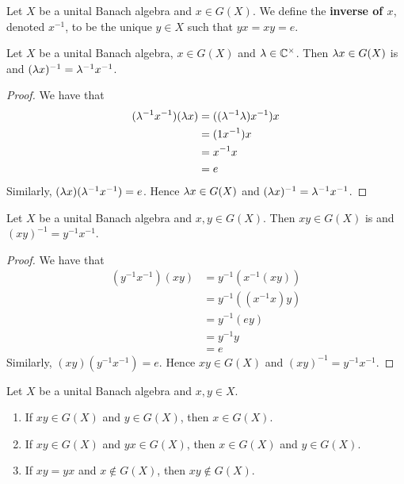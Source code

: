 \documentclass{book}
\begin{document}
\begin{defn} \ld{}
	Let $X$ be a unital Banach algebra and $x \in G(X)$. We define the \textbf{inverse of $x$}, denoted $x^{-1}$, to be the unique $y \in X$ such that $yx = xy = e$.
\end{defn}

\begin{ex}
	Let $X$ be a unital Banach algebra, $x \in G(X)$ and $\lambda \in \mathbb{C}^{\times}$. Then $\lambda x \in G(X)$ is and $(\lambda x)^{-1} = \lambda^{-1}x^{-1}$.
\end{ex}

\begin{proof}
	We have that 
	\begin{align*}
		(\lambda^{-1}x^{-1})( \lambda x)
		& = ((\lambda^{-1} \lambda )x^{-1}) x \\
		& = (1x^{-1}) x \\
		& = x^{-1}x \\
		& = e \\
	\end{align*}
	Similarly, $( \lambda x)(\lambda^{-1}x^{-1}) = e$. Hence $\lambda x \in G(X)$ and $(\lambda x)^{-1} = \lambda^{-1}x^{-1}$.
\end{proof}

\begin{ex}
	Let $X$ be a unital Banach algebra and $x,y \in G(X)$. Then $xy \in G(X)$ is and $(xy)^{-1} = y^{-1}x^{-1}$.
\end{ex}

\begin{proof}
	We have that 
	\begin{align*}
		(y^{-1}x^{-1})(xy)
		& = y^{-1}(x^{-1} (x y)) \\
		& = y^{-1}((x^{-1} x) y) \\
		& = y^{-1} (e y) \\
		& = y^{-1} y \\
		& = e
	\end{align*}
	Similarly, $(xy)(y^{-1}x^{-1}) = e$. Hence $xy \in G(X)$ and $(xy)^{-1} = y^{-1}x^{-1}$.
\end{proof}

\begin{ex}
	Let $X$ be a unital Banach algebra and $x,y \in X$. 
	\begin{enumerate}
		\item If $xy \in G(X)$ and $y \in G(X)$, then $x \in G(X)$.
		\item If $xy\in G(X)$ and $yx \in G(X)$, then $x \in G(X)$ and $y \in G(X)$.
		\item If $xy = yx$ and $x \not \in G(X)$, then $xy \not \in G(X)$.
	\end{enumerate}
\end{ex}
\end{document}
